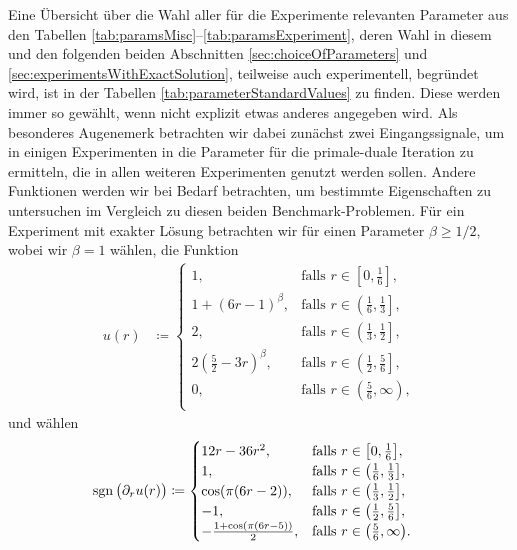 Eine Übersicht über die Wahl aller für die Experimente relevanten Parameter aus
den Tabellen \ref{tab:paramsMisc}--\ref{tab:paramsExperiment}, deren Wahl in
diesem und den folgenden beiden Abschnitten \ref{sec:choiceOfParameters} und
\ref{sec:experimentsWithExactSolution}, teilweise auch experimentell, begründet
wird, ist in der Tabellen \ref{tab:parameterStandardValues} zu finden.
Diese werden immer so gewählt, wenn nicht explizit etwas anderes angegeben
wird.
Als besonderes Augenemerk betrachten wir dabei zunächst zwei Eingangssignale,
um in einigen Experimenten in  die Parameter für
die primale-duale Iteration zu ermitteln, die in allen weiteren Experimenten
genutzt werden sollen.
Andere Funktionen werden wir bei Bedarf betrachten, um bestimmte Eigenschaften
zu untersuchen im Vergleich zu diesen beiden Benchmark-Problemen.
Für ein Experiment mit exakter Lösung betrachten wir für einen Parameter
$\beta\geq 1/2$, wobei wir $\beta =1$ wählen, die Funktion
\begin{align*}
  u(r)&\coloneqq
  \begin{cases}
    1, 
    & \text{falls } r\in \left[0,\frac{1}{6}\right]\!,\\
    1+(6r-1)^\beta, 
    & \text{falls } r\in \left(\frac{1}{6}, \frac{1}{3}\right]\!,\\
    2, 
    & \text{falls } r\in \left(\frac{1}{3}, \frac{1}{2}\right]\!,\\
    2\left(\frac{5}{2}-3r\right)^\beta, 
    & \text{falls } r\in \left(\frac{1}{2}, \frac{5}{6}\right]\!,\\
    0, 
    & \text{falls } r\in \left(\frac{5}{6}, \infty\right)\!,\\
  \end{cases}
\end{align*}
und wählen
\begin{align*}
  \operatorname{sgn}\big(\partial_r u(r)\big) 
  &\coloneqq
  \begin{cases}
    12r-36r^2, 
    & \text{falls } r\in \left[0,\frac{1}{6}\right]\!,\\
    1, 
    & \text{falls } r\in \left(\frac{1}{6}, \frac{1}{3}\right]\!,\\
    \cos(\pi(6r-2)), 
    & \text{falls } r\in \left(\frac{1}{3}, \frac{1}{2}\right]\!,\\
    -1, 
    & \text{falls } r\in \left(\frac{1}{2}, \frac{5}{6}\right]\!,\\
    -\frac{1+\cos(\pi(6r-5))}{2}, 
    & \text{falls } r\in \left(\frac{5}{6}, \infty\right)\!.
  \end{cases}
\end{align*}
